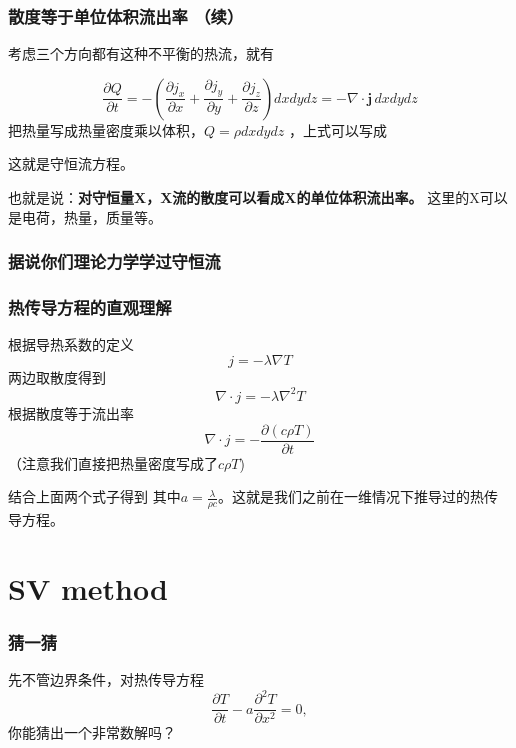 \documentclass[CJK]{beamer}
\begin{document}
\begin{frame}
  \frametitle{散度等于单位体积流出率 （续）}
  
{\small
  考虑三个方向都有这种不平衡的热流，就有

  $$ \frac{\partial Q}{\partial t} = - \left(\frac{\partial j_x}{\partial x} + \frac{\partial j_y}{\partial y} + \frac{\partial j_z}{\partial z}\right)  dxdydz = -\nabla\cdot \mathbf{j} \, dx dy dz $$
  把热量写成热量密度乘以体积，$Q = \rho dxdydz$ ，上式可以写成
}

这就是守恒流方程。

也就是说：{\blue \bf 对守恒量X，X流的散度可以看成X的单位体积流出率。} 这里的X可以是电荷，热量，质量等。

  
\end{frame}


\begin{frame}
  \frametitle{据说你们理论力学学过守恒流}
  
  
\end{frame}

\begin{frame}
  \frametitle{热传导方程的直观理解}
  
  {\small
  根据导热系数的定义
  $$j = -\lambda\nabla T$$
  两边取散度得到
  $$\nabla \cdot j = -\lambda \nabla^2T$$
  根据散度等于流出率
  $$\nabla\cdot j = -\frac{\partial (c\rho T)}{\partial t}$$
  （注意我们直接把热量密度写成了$c\rho T$)

    结合上面两个式子得到
    其中$a = \frac{\lambda}{\rho c}$。这就是我们之前在一维情况下推导过的热传导方程。
  }  
  
\end{frame}

\section{SV method}


\begin{frame}
  \frametitle{猜一猜}
  

  
  先不管边界条件，对热传导方程
  $$ \frac{\partial T}{\partial t} - a\frac{\partial^2T}{\partial x^2} = 0,$$
  你能猜出一个非常数解吗？
  
  
\end{frame}
\end{document}
